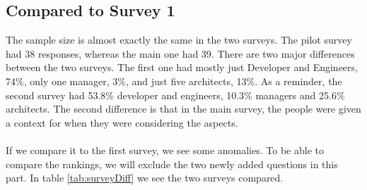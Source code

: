 \documentclass{cslthse-msc}
\begin{document}
    \subsection{Compared to Survey 1}

    The sample size is almost exactly the same in the two surveys. The pilot
    survey had 38 responses, whereas the main one had 39. There are two
    major differences between the two surveys. The first one had mostly just
    Developer and Engineers, 74\%, only one manager, 3\%, and just five
    architects, 13\%. As a reminder, the second survey had 53.8\% developer
    and engineers, 10.3\% managers and 25.6\% architects. The second
    difference is that in the main survey, the people were given a context
    for when they were considering the aspects.
    \\ \\
    If we compare it to the first survey, we see some anomalies. To be able
    to compare the rankings, we will exclude the two newly added questions
    in this part. In table \ref{tab:surveyDiff} we see the two surveys compared.
\end{document}
